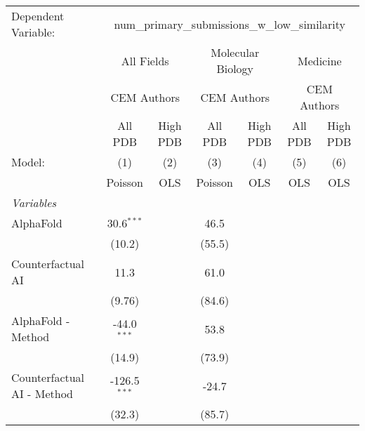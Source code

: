 \begingroup
\centering
\begin{tabular}{lcccccc}
   \tabularnewline \midrule \midrule
   Dependent Variable: & \multicolumn{6}{c}{num\_primary\_submissions\_w\_low\_similarity}\\
 & \multicolumn{2}{c}{All Fields} & \multicolumn{2}{c}{Molecular Biology} & \multicolumn{2}{c}{Medicine} \\
\cmidrule(lr){2-3} \cmidrule(lr){4-5} \cmidrule(lr){6-7}
 & \multicolumn{2}{c}{CEM Authors} & \multicolumn{2}{c}{CEM Authors} & \multicolumn{2}{c}{CEM Authors} \\
\cmidrule(lr){2-3} \cmidrule(lr){4-5} \cmidrule(lr){6-7}
 & \multicolumn{1}{c}{All PDB} & \multicolumn{1}{c}{High PDB} & \multicolumn{1}{c}{All PDB} & \multicolumn{1}{c}{High PDB} & \multicolumn{1}{c}{All PDB} & \multicolumn{1}{c}{High PDB} \\
\cmidrule(lr){2-2} \cmidrule(lr){3-3} \cmidrule(lr){4-4} \cmidrule(lr){5-5} \cmidrule(lr){6-6} \cmidrule(lr){7-7}
   Model:                                                  & (1)            & (2)  & (3)     & (4)  & (5)  & (6)\\  
                                                           &  Poisson       & OLS  & Poisson & OLS  & OLS  & OLS\\  
   \midrule
   \emph{Variables}\\
   AlphaFold                                               & 30.6$^{***}$   &      & 46.5    &      &      &   \\   
                                                           & (10.2)         &      & (55.5)  &      &      &   \\   
   Counterfactual AI                                       & 11.3           &      & 61.0    &      &      &   \\   
                                                           & (9.76)         &      & (84.6)  &      &      &   \\   
   AlphaFold - Method                                      & -44.0$^{***}$  &      & 53.8    &      &      &   \\   
                                                           & (14.9)         &      & (73.9)  &      &      &   \\   
   Counterfactual AI - Method                              & -126.5$^{***}$ &      & -24.7   &      &      &   \\   
                                                           & (32.3)         &      & (85.7)  &      &      &   \\   

\end{tabular}

